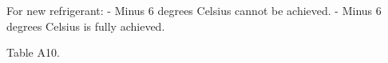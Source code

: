 For new refrigerant:  
- Minus 6 degrees Celsius cannot be achieved.  
- Minus 6 degrees Celsius is fully achieved.  

Table A10.